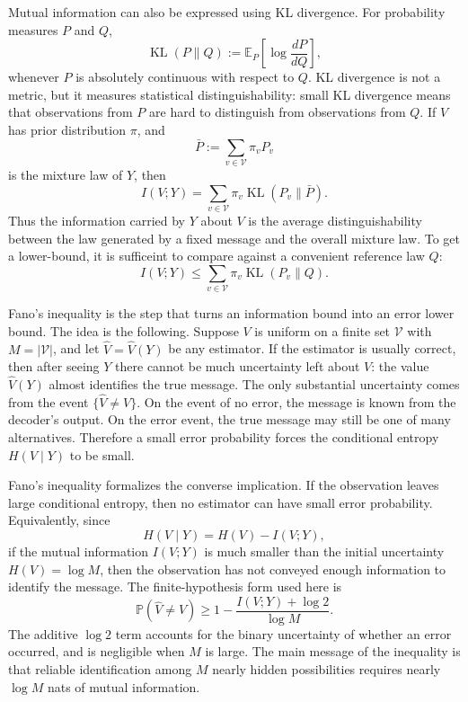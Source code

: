 \documentclass{article}
\newcommand{\KL}{\operatorname{KL}}
\newcommand{\Pbb}{\mathbb{P}}
\newcommand{\E}{\mathbb{E}}
\begin{document}
Mutual information can also be expressed using KL divergence. For probability measures \(P\) and \(Q\),
\[
  \KL(P\|Q)
  :=
  \E_P\left[\log\frac{dP}{dQ}\right],
\]
whenever \(P\) is absolutely continuous with respect to \(Q\). KL divergence is not a metric, but it measures statistical distinguishability: small KL divergence means that observations from \(P\) are hard to distinguish from observations from \(Q\). If \(V\) has prior distribution \(\pi\), and
\[
  \bar P:=\sum_{v\in\mathcal V}\pi_v P_v
\]
is the mixture law of \(Y\), then
\[
  I(V;Y)
  =
  \sum_{v\in\mathcal V}\pi_v \KL(P_v\|\bar P).
\]
Thus the information carried by \(Y\) about \(V\) is the average distinguishability between the law generated by a fixed message and the overall mixture law. 
To get a lower-bound, it is sufficeint to compare against a convenient reference law \(Q\):
\[
  I(V;Y)
  \le
  \sum_{v\in\mathcal V}\pi_v \KL(P_v\|Q).
\]

Fano's inequality is the step that turns an information bound into an error lower bound. 
The idea is the following. 
Suppose \(V\) is uniform on a finite set \(\mathcal V\) with \(M=|\mathcal V|\), and let \(\widehat V=\widehat V(Y)\) be any estimator. 
If the estimator is usually correct, then after seeing \(Y\) there cannot be much uncertainty left about \(V\): the value \(\widehat V(Y)\) almost identifies the true message. 
The only substantial uncertainty comes from the event \(\{\widehat V\neq V\}\). 
On the event of no error, the message is known from the decoder's output. On the error event, the true message may still be one of many alternatives. 
Therefore a small error probability forces the conditional
entropy \(H(V\mid Y)\) to be small.

Fano's inequality formalizes the converse implication. If the observation leaves large conditional entropy, then no estimator can have small error probability. 
Equivalently, since
\[
  H(V\mid Y)=H(V)-I(V;Y),
\]
if the mutual information \(I(V;Y)\) is much smaller than the initial uncertainty \(H(V)=\log M\), then the observation has not conveyed enough information to identify the message. The finite-hypothesis form used here is
\[
  \Pbb(\widehat V\neq V)
  \ge
  1-\frac{I(V;Y)+\log 2}{\log M}.
\]
The additive \(\log 2\) term accounts for the binary uncertainty of whether an error occurred, and is negligible when \(M\) is large. 
The main message of the inequality is that reliable identification among \(M\) nearly hidden possibilities requires nearly \(\log M\) nats of mutual information.
\end{document}
